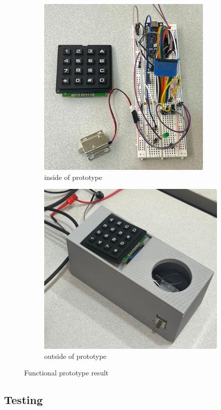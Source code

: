 \begin{figure}[!ht]
\centering
\begin{subfigure}{.5\textwidth}
  \centering
  \includegraphics[width=.7\linewidth]{img/prototypeInside.png}
  \caption{inside of prototype}
  \label{fig:prototypeInside}
\end{subfigure}%
\begin{subfigure}{.5\textwidth}
  \centering
  \includegraphics[width=.7\linewidth]{img/prototypeOutside.png}
  \caption{outside of prototype}
  \label{fig:prototypeOutside}
\end{subfigure}
\caption{Functional prototype result}
\label{fig:test}
\end{figure}


\subsection{Testing}

